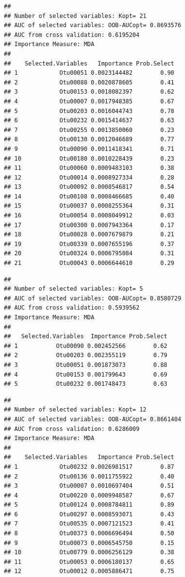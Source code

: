 \documentclass[11pt,]{article}
\begin{document}
\begin{verbatim}
## 
## Number of selected variables: Kopt= 21 
## AUC of selected variables: OOB-AUCopt= 0.8693576 
## AUC from cross validation: 0.6195204 
## Importance Measure: MDA 
## 
##    Selected.Variables   Importance Prob.Select
## 1            Otu00051 0.0023144482        0.90
## 2            Otu00088 0.0020878605        0.41
## 3            Otu00153 0.0018082397        0.62
## 4            Otu00007 0.0017948385        0.67
## 5            Otu00203 0.0016044743        0.78
## 6            Otu00232 0.0015414637        0.63
## 7            Otu00255 0.0013850060        0.23
## 8            Otu00130 0.0012046689        0.77
## 9            Otu00090 0.0011418341        0.71
## 10           Otu00180 0.0010228439        0.23
## 11           Otu00060 0.0009483103        0.38
## 12           Otu00014 0.0008927334        0.28
## 13           Otu00092 0.0008546817        0.54
## 14           Otu00108 0.0008466685        0.40
## 15           Otu00037 0.0008255364        0.31
## 16           Otu00054 0.0008049912        0.03
## 17           Otu00300 0.0007943364        0.17
## 18           Otu00028 0.0007679879        0.21
## 19           Otu00339 0.0007655196        0.37
## 20           Otu00324 0.0006795084        0.31
## 21           Otu00043 0.0006644610        0.29
\end{verbatim}

\begin{verbatim}
## 
## Number of selected variables: Kopt= 5 
## AUC of selected variables: OOB-AUCopt= 0.8580729 
## AUC from cross validation: 0.5939562 
## Importance Measure: MDA 
## 
##   Selected.Variables  Importance Prob.Select
## 1           Otu00090 0.002452566        0.62
## 2           Otu00203 0.002355119        0.79
## 3           Otu00051 0.001873073        0.88
## 4           Otu00153 0.001799643        0.69
## 5           Otu00232 0.001748473        0.63
\end{verbatim}

\begin{verbatim}
## 
## Number of selected variables: Kopt= 12 
## AUC of selected variables: OOB-AUCopt= 0.8661404 
## AUC from cross validation: 0.6286009 
## Importance Measure: MDA 
## 
##    Selected.Variables   Importance Prob.Select
## 1            Otu00232 0.0026981517        0.87
## 2            Otu00136 0.0011755922        0.40
## 3            Otu00007 0.0010697404        0.51
## 4            Otu00220 0.0009948587        0.67
## 5            Otu00124 0.0008784811        0.89
## 6            Otu00297 0.0008593071        0.43
## 7            Otu00535 0.0007121523        0.41
## 8            Otu00373 0.0006696494        0.50
## 9            Otu00073 0.0006545750        0.15
## 10           Otu00779 0.0006256129        0.38
## 11           Otu00053 0.0006180137        0.65
## 12           Otu00012 0.0005886471        0.75
\end{verbatim}
\end{document}
